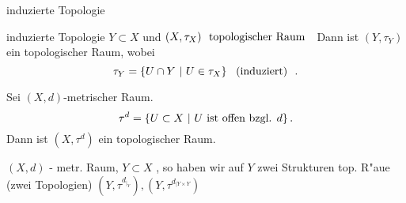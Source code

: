 \documentclass[class=article, crop=false]{standalone}
\begin{document}
\begin{zettel}{induzierte Topologie}
\begin{flashcard}[keptp901]{induzierte Topologie}
	$Y \subset X$ und $(X,\tau_X)  \tx{ topologischer Raum }$
	Dann ist $(Y,\tau_Y)$ ein topologischer Raum, wobei
	\[
		\tau_Y = \set{U \cap Y}{U \in  \tau _X} \tx{ (induziert) }
	.\]
\end{flashcard}

\begin{example}
	Sei $ (X,d) $-metrischer Raum.
	\[
		\tau^d = \set{U \subset X}{U \text{ ist offen bzgl. } d }
	.\]
	Dann ist $(X, \tau^d)$  ein topologischer Raum.
\end{example}

\begin{example}
	$(X,d)$ - metr. Raum, $Y \subset X$ , so haben wir auf $Y$ zwei Strukturen top. R"aue (zwei Topologien) $(Y,\tau^{d_{|_Y}}), (Y, \tau^{d_{|Y \times Y}})$
\end{example}

\end{zettel}
\end{document}
